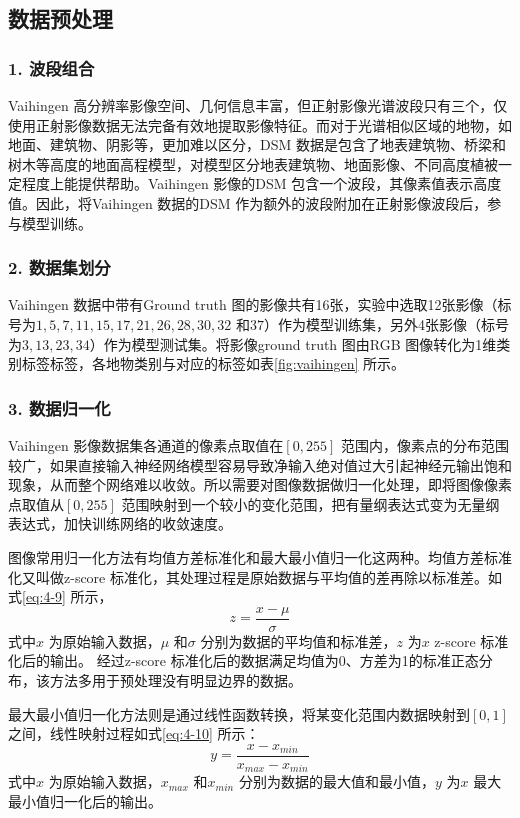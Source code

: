 \subsection{数据预处理}
\label{sec:second-1}

\subsubsection*{1. 波段组合}
Vaihingen 高分辨率影像空间、几何信息丰富，但正射影像光谱波段只有三个，仅使用正射影像数据无法完备有效地提取影像特征。而对于光谱相似区域的地物，如地面、建筑物、阴影等，更加难以区分，DSM 数据是包含了地表建筑物、桥梁和树木等高度的地面高程模型，对模型区分地表建筑物、地面影像、不同高度植被一定程度上能提供帮助。Vaihingen 影像的DSM 包含一个波段，其像素值表示高度值。因此，将Vaihingen 数据的DSM 作为额外的波段附加在正射影像波段后，参与模型训练。

\subsubsection*{2. 数据集划分}
Vaihingen 数据中带有Ground truth 图的影像共有16张，实验中选取12张影像（标号为$1,5,7,11,15,17,21,26,28,30,32$ 和$37$）作为模型训练集，另外4张影像（标号为$3,13,23,34$）作为模型测试集。将影像ground truth 图由RGB 图像转化为1维类别标签标签，各地物类别与对应的标签如表\ref{fig:vaihingen} 所示。

\subsubsection*{3. 数据归一化}
Vaihingen 影像数据集各通道的像素点取值在$[0,255]$ 范围内，像素点的分布范围较广，如果直接输入神经网络模型容易导致净输入绝对值过大引起神经元输出饱和现象，从而整个网络难以收敛。所以需要对图像数据做归一化处理，即将图像像素点取值从$[0,255]$ 范围映射到一个较小的变化范围，把有量纲表达式变为无量纲表达式，加快训练网络的收敛速度。

图像常用归一化方法有均值方差标准化和最大最小值归一化这两种。均值方差标准化又叫做z-score 标准化，其处理过程是原始数据与平均值的差再除以标准差。如式\ref{eq:4-9} 所示，
\begin{equation}
  \label{eq:4-9}
  z = \frac{x-\mu}{\sigma}
\end{equation}
式中$x$ 为原始输入数据，$\mu$ 和$\sigma$ 分别为数据的平均值和标准差，$z$ 为$x$ z-score 标准化后的输出。 经过z-score 标准化后的数据满足均值为0、方差为1的标准正态分布，该方法多用于预处理没有明显边界的数据。

最大最小值归一化方法则是通过线性函数转换，将某变化范围内数据映射到$[0,1]$ 之间，线性映射过程如式\ref{eq:4-10} 所示：
\begin{equation}
  \label{eq:4-10}
  y = \frac{x-x_{min}}{x_{max}-x_{min}}
\end{equation}
式中$x$ 为原始输入数据，$x_{max}$ 和$x_{min}$ 分别为数据的最大值和最小值，$y$ 为$x$ 最大最小值归一化后的输出。

